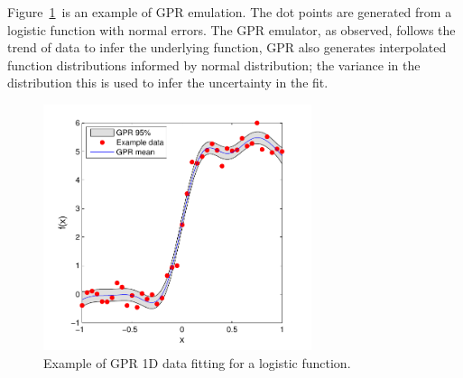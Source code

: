 \documentclass[review]{elsarticle}
\begin{document}
Figure~\ref{fg:gpex}~is an example of GPR emulation. The dot points are generated from a logistic function with normal errors. The GPR emulator, as observed, follows the trend of data to infer the underlying function, GPR also generates interpolated function distributions informed by normal distribution; the variance in the distribution this is used to infer the uncertainty in the fit.

\begin{figure}[ht!]
  \begin{center}
    \includegraphics[width=0.7\textwidth]{NSE15-48R1_Figure7.pdf}
    \caption[]{\label{fg:gpex}Example of GPR 1D data fitting for a logistic function.}%
  \end{center}
\end{figure}


\end{document}
